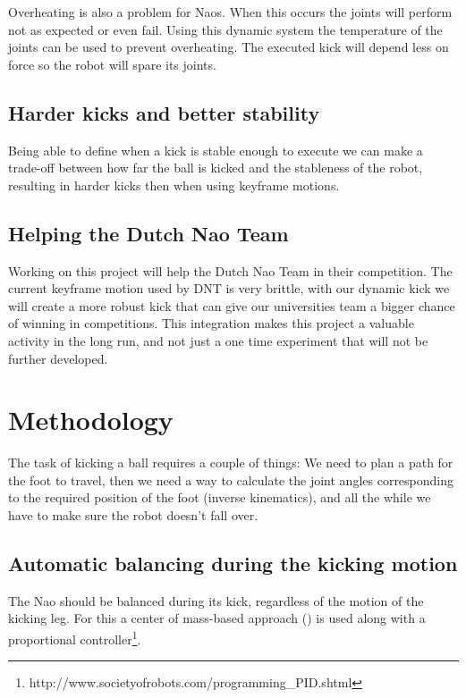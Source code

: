 \documentclass[a4paper]{article}
\begin{document}
Overheating is also a problem for Naos. When this occurs the joints will perform
not as expected or even fail. Using this dynamic system the temperature of the
joints can be used to prevent overheating. The executed kick will depend less
on force so the robot will spare its joints.

\subsection{Harder kicks and better stability}
Being able to define when a kick is stable enough to execute we can make a
trade-off between how far the ball is kicked and the stableness of the
robot, resulting in harder kicks then when using keyframe motions.

\subsection{Helping the Dutch Nao Team}
 Working on this project will help the Dutch Nao Team in their competition. The
current keyframe motion used by DNT is very brittle, with our dynamic kick we will create a
more robust kick that can give our universities team a bigger chance of
winning in competitions. 
This integration makes this project a valuable activity in the long run, and not
just a one time experiment that will not be further developed.

\section{Methodology}
The task of kicking a ball requires a couple of things: We need to plan a path
for the foot to travel, then we need a way to calculate the joint angles
corresponding to the required position of the foot (inverse kinematics), and all
the while we have to make sure the robot doesn't fall over.

\subsection{Automatic balancing during the kicking motion}
The Nao should be balanced during its kick, regardless of the motion of the
kicking leg. For this a center of mass-based approach (\cite{Xu2010}) is used
along with a proportional
controller\footnote{http://www.societyofrobots.com/programming\_PID.shtml}.
\end{document}
